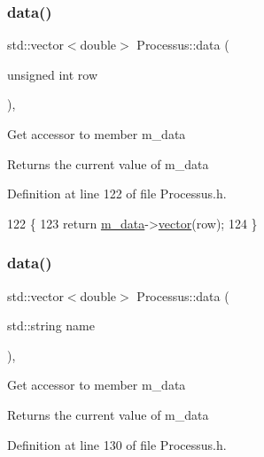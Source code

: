 \subsubsection{\texorpdfstring{data()}{data()}\hspace{0.1cm}{\footnotesize\ttfamily [2/3]}}
{\footnotesize\ttfamily std\+::vector$<$double$>$ Processus\+::data (\begin{DoxyParamCaption}\item[{unsigned int}]{row }\end{DoxyParamCaption})\hspace{0.3cm}{\ttfamily [inline]}, {\ttfamily [inherited]}}

Get accessor to member m\+\_\+data \begin{DoxyReturn}{Returns}
the current value of m\+\_\+data 
\end{DoxyReturn}


Definition at line 122 of file Processus.\+h.


\begin{DoxyCode}
122                                           \{
123     \textcolor{keywordflow}{return} \hyperlink{classProcessus_a3da9a9de8af54e2f47807a3e09dfccff}{m\_data}->\hyperlink{classData_a94e00cdd58c1d6f11487f1ac47fee4bc}{vector}(row);
124   \}
\end{DoxyCode}
\mbox{\label{classProcessus_abf4d91fb36707e1d50178bab12d21ae9}} 
\subsubsection{\texorpdfstring{data()}{data()}\hspace{0.1cm}{\footnotesize\ttfamily [3/3]}}
{\footnotesize\ttfamily std\+::vector$<$double$>$ Processus\+::data (\begin{DoxyParamCaption}\item[{std\+::string}]{name }\end{DoxyParamCaption})\hspace{0.3cm}{\ttfamily [inline]}, {\ttfamily [inherited]}}

Get accessor to member m\+\_\+data \begin{DoxyReturn}{Returns}
the current value of m\+\_\+data 
\end{DoxyReturn}


Definition at line 130 of file Processus.\+h.


